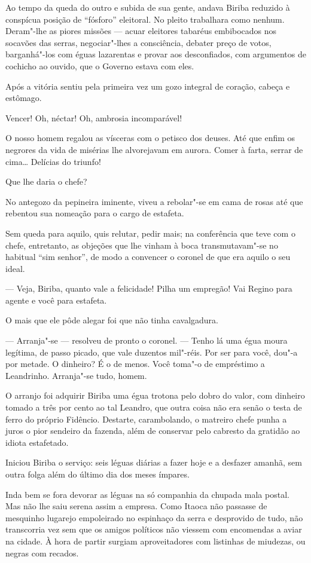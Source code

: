 Ao tempo da queda do outro e subida de sua gente, andava Biriba reduzido
à conspícua posição de ``fósforo'' eleitoral. No pleito trabalhara como
nenhum. Deram"-lhe as piores missões --- acuar eleitores tabaréus
embibocados nos socavões das serras, negociar"-lhes a consciência,
debater preço de votos, barganhá"-los com éguas lazarentas e provar aos
desconfiados, com argumentos de cochicho ao ouvido, que o Governo estava
com eles.

Após a vitória sentiu pela primeira vez um gozo integral de coração,
cabeça e estômago.

Vencer! Oh, néctar! Oh, ambrosia incomparável!

O nosso homem regalou as vísceras com o petisco dos deuses. Até que
enfim os negrores da vida de misérias lhe alvorejavam em aurora. Comer à
farta, serrar de cima\ldots{} Delícias do triunfo!

Que lhe daria o chefe?

No antegozo da pepineira iminente, viveu a rebolar"-se em cama de rosas
até que rebentou sua nomeação para o cargo de estafeta.

Sem queda para aquilo, quis relutar, pedir mais; na conferência que teve
com o chefe, entretanto, as objeções que lhe vinham à boca
transmutavam"-se no habitual ``sim senhor'', de modo a convencer o
coronel de que era aquilo o seu ideal.

--- Veja, Biriba, quanto vale a felicidade! Pilha um empregão! Vai
Regino para agente e você para estafeta.

O mais que ele pôde alegar foi que não tinha cavalgadura.

--- Arranja"-se --- resolveu de pronto o coronel. --- Tenho lá uma égua
moura legítima, de passo picado, que vale duzentos mil"-réis. Por ser
para você, dou"-a por metade. O dinheiro? É o de menos. Você toma"-o de
empréstimo a Leandrinho. Arranja"-se tudo, homem.

O arranjo foi adquirir Biriba uma égua trotona pelo dobro do valor, com
dinheiro tomado a três por cento ao tal Leandro, que outra coisa não era
senão o testa de ferro do próprio Fidêncio. Destarte, carambolando, o
matreiro chefe punha a juros o pior sendeiro da fazenda, além de
conservar pelo cabresto da gratidão ao idiota estafetado.

Iniciou Biriba o serviço: seis léguas diárias a fazer hoje e a desfazer
amanhã, sem outra folga além do último dia dos meses ímpares.

Inda bem se fora devorar as léguas na só companhia da chupada mala
postal. Mas não lhe saiu serena assim a empresa. Como Itaoca não
passasse de mesquinho lugarejo empoleirado no espinhaço da serra e
desprovido de tudo, não transcorria vez sem que os amigos políticos não
viessem com encomendas a aviar na cidade. À hora de partir surgiam
aproveitadores com listinhas de miudezas, ou negras com recados.

